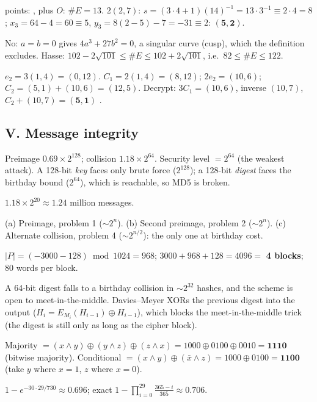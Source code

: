  points: , plus $O$: $\#E = 13$. $2(2,7)$: $s = (3 \cdot 4 + 1)(14)^{-1} = 13 \cdot 3^{-1} \equiv 2 \cdot 4 = 8$; $x_3 = 64 - 4 = 60 \equiv 5$, $y_3 = 8(2 - 5) - 7 = -31 \equiv 2$: $\mathbf{(5, 2)}$.

\ans No: $a = b = 0$ gives $4a^3 + 27b^2 = 0$, a singular curve (cusp), which the definition excludes. Hasse: $102 - 2\sqrt{101} \le \#E \le 102 + 2\sqrt{101}$, i.e.\ $82 \le \#E \le 122$.

\ans $e_2 = 3(1, 4) = (0, 12)$. $C_1 = 2(1, 4) = (8, 12)$; $2e_2 = (10, 6)$; $C_2 = (5, 1) + (10, 6) = (12, 5)$. Decrypt: $3C_1 = (10, 6)$, inverse $(10, 7)$, $C_2 + (10, 7) = \mathbf{(5, 1)}$ \checkmark.

\subsection*{V. Message integrity}
\ans Preimage $0.69 \times 2^{128}$; collision $1.18 \times 2^{64}$. Security level $= 2^{64}$ (the weakest attack). A 128-bit \emph{key} faces only brute force ($2^{128}$); a 128-bit \emph{digest} faces the birthday bound ($2^{64}$), which is reachable, so MD5 is broken.

\ans $1.18 \times 2^{20} \approx 1.24$ million messages.

\ans (a) Preimage, problem 1 ($\sim 2^n$). (b) Second preimage, problem 2 ($\sim 2^n$). (c) Alternate collision, problem 4 ($\sim 2^{n/2}$): the only one at birthday cost.

\ans $|P| = (-3000 - 128) \bmod 1024 = 968$; $3000 + 968 + 128 = 4096 = $ \textbf{4 blocks}; 80 words per block.

\ans A 64-bit digest falls to a birthday collision in $\sim 2^{32}$ hashes, and the scheme is open to meet-in-the-middle. Davies--Meyer XORs the previous digest into the output ($H_i = E_{M_i}(H_{i-1}) \oplus H_{i-1}$), which blocks the meet-in-the-middle trick (the digest is still only as long as the cipher block).

\ans Majority $= (x \wedge y) \oplus (y \wedge z) \oplus (z \wedge x) = 1000 \oplus 0100 \oplus 0010 = \mathbf{1110}$ (bitwise majority). Conditional $= (x \wedge y) \oplus (\bar x \wedge z) = 1000 \oplus 0100 = \mathbf{1100}$ (take $y$ where $x = 1$, $z$ where $x = 0$).

\ans $1 - e^{-30 \cdot 29/730} \approx 0.696$; exact $1 - \prod_{i=0}^{29}\frac{365 - i}{365} \approx 0.706$.
